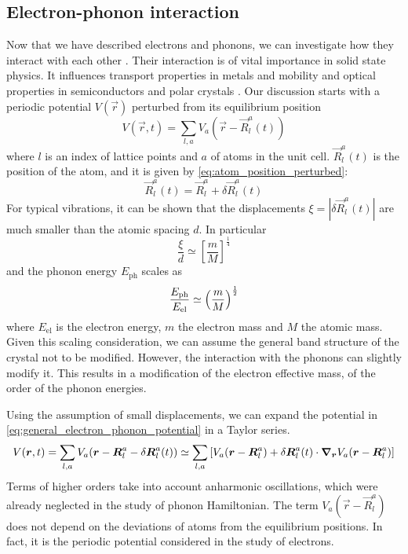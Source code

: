 \subsection{Electron-phonon interaction} \label{sec:electrons_phonons_interaction}
Now that we have described electrons and phonons, we can investigate how they interact with each other \cite{cohenFundamentalsCondensedMatter, tempere}. Their interaction is of vital importance in solid state physics. It influences transport properties in metals and mobility and optical properties in semiconductors and polar crystals \cite{tempere}. Our discussion starts with a periodic potential $V(\vec{r})$ perturbed from its equilibrium position
\begin{equation} \label{eq:general_electron_phonon_potential}
    V(\vec{r}, t) = \sum_{l,a} V_a(\vec{r} - \vec{R}_l^a(t))
\end{equation}
where $l$ is an index of lattice points and $a$ of atoms in the unit cell. $\vec{R}_l^a(t)$ is the position of the atom, and it is given by \cref{eq:atom_position_perturbed}:
\begin{equation}
    \vec{R}_l^a(t) = \vec{R}_l^a + \delta \vec{R}_l^a(t)
\end{equation}
For typical vibrations, it can be shown that the displacements $\xi = |\delta \vec{R}_l^a(t)|$ are much smaller than the atomic spacing $d$. In particular
\begin{equation}
    \frac{\xi}{d} \simeq \left[ \frac{m}{M} \right]^\frac{1}{4}
\end{equation}
and the phonon energy $E_\text{ph}$ scales as
\begin{equation}
    \frac{E_\text{ph}}{E_\text{el}} \simeq \left( \frac{m}{M} \right)^{\frac{1}{2}}
\end{equation}
where $E_\text{el}$ is the electron energy, $m$ the electron mass and $M$ the atomic mass. Given this scaling consideration, we can assume the general band structure of the crystal not to be modified. However, the interaction with the phonons can slightly modify it. This results in a modification of the electron effective mass, of the order of the phonon energies.

Using the assumption of small displacements, we can expand the potential in \cref{eq:general_electron_phonon_potential} in a Taylor series.
\begin{multline}
    V(\mathbf{\boldsymbol{r}}, t) = \sum_{l,a} V_a(\mathbf{\boldsymbol{r}} - \mathbf{\boldsymbol{R}}_l^a - \delta \mathbf{\boldsymbol{R}}_l^a(t))
    \simeq \sum_{l,a} \left[ V_a(\mathbf{\boldsymbol{r}} - \mathbf{\boldsymbol{R}}_l^a) + \delta \mathbf{\boldsymbol{R}}_l^a(t) \cdot \grad_{\mathbf{\boldsymbol{r}}} V_a(\mathbf{\boldsymbol{r}} - \mathbf{\boldsymbol{R}}_l^a) \right]
\end{multline}
Terms of higher orders take into account anharmonic oscillations, which were already neglected in the study of phonon Hamiltonian. The term $V_a(\vec{r} - \vec{R}_l^a)$ does not depend on the deviations of atoms from the equilibrium positions. In fact, it is the periodic potential considered in the study of electrons.

